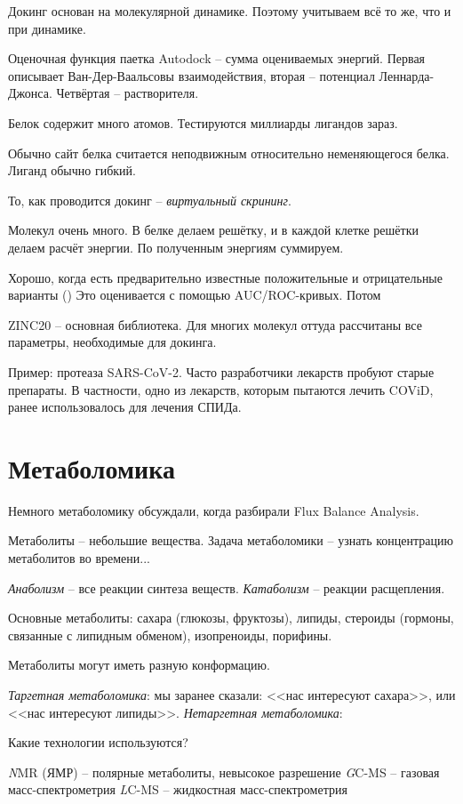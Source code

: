 \documentclass[main.tex]{subfiles}
\begin{document}
Докинг основан на молекулярной динамике.
Поэтому учитываем всё то же, что и при динамике.

Оценочная функция паетка Autodock -- сумма оцениваемых энергий.
Первая описывает Ван-Дер-Ваальсовы взаимодействия, вторая -- потенциал Леннарда-Джонса.
Четвёртая -- растворителя.

Белок содержит много атомов.
Тестируются миллиарды лигандов зараз.

Обычно сайт белка считается неподвижным относительно неменяющегося белка.
Лиганд обычно гибкий.

То, как проводится докинг -- \emph{виртуальный скрининг}.

Молекул очень много.
В белке делаем решётку, и в каждой клетке решётки делаем расчёт энергии.
По полученным энергиям суммируем.

Хорошо, когда есть предварительно известные положительные и отрицательные варианты ()
Это оценивается с помощью AUC/ROC-кривых.
Потом 

ZINC20 -- основная библиотека.
Для многих молекул оттуда рассчитаны все параметры, необходимые для докинга.

Пример: протеаза SARS-CoV-2.
Часто разработчики лекарств пробуют старые препараты.
В частности, одно из лекарств, которым пытаются лечить COViD, ранее использовалось для лечения СПИДа.

\section{Метаболомика}

Немного метаболомику обсуждали, когда разбирали  Flux Balance Analysis.

Метаболиты -- небольшие вещества.
Задача метаболомики -- узнать концентрацию метаболитов во времени...

\emph{Анаболизм} -- все реакции синтеза веществ.
\emph{Катаболизм} -- реакции расщепления.

Основные метаболиты: сахара (глюкозы, фруктозы), липиды, стероиды (гормоны, связанные с липидным обменом), изопреноиды, порифины.

Метаболиты могут иметь разную конформацию.

\emph{Таргетная метаболомика}: мы заранее сказали: <<нас интересуют сахара>>, или <<нас интересуют липиды>>.
\emph{Нетаргетная метаболомика}: 

Какие технологии используются?
\begin{enumerate}[noitemsep]
	\emph NMR (ЯМР) -- полярные метаболиты, невысокое разрешение
	\emph GC-MS -- газовая масс-спектрометрия
	\emph LC-MS -- жидкостная масс-спектрометрия
\end{enumerate}
\end{document}
